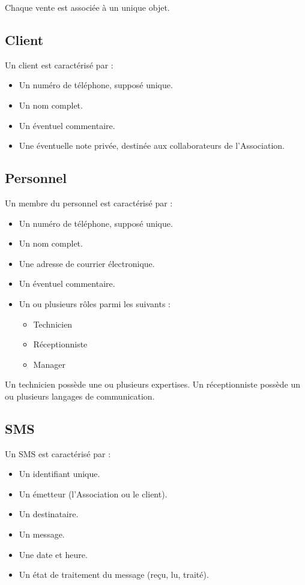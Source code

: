 \documentclass{article}
\begin{document}
Chaque vente est associée à un unique objet.

\subsection*{Client}
Un client est caractérisé par :
\begin{itemize}
    \item Un numéro de téléphone, supposé unique.
    \item Un nom complet.
    \item Un éventuel commentaire.
    \item Une éventuelle note privée, destinée aux collaborateurs de l'Association.
\end{itemize}

\subsection*{Personnel}
Un membre du personnel est caractérisé par :
\begin{itemize}
    \item Un numéro de téléphone, supposé unique.
    \item Un nom complet.
    \item Une adresse de courrier électronique.
    \item Un éventuel commentaire.
    \item Un ou plusieurs rôles parmi les suivants :
    \begin{itemize}
        \item Technicien
        \item Réceptionniste
        \item Manager
    \end{itemize}
\end{itemize}

Un technicien possède une ou plusieurs expertises. Un réceptionniste possède un ou plusieurs langages de communication.

\subsection*{SMS}
Un SMS est caractérisé par :
\begin{itemize}
    \item Un identifiant unique.
    \item Un émetteur (l'Association ou le client).
    \item Un destinataire.
    \item Un message.
    \item Une date et heure.
    \item Un état de traitement du message (reçu, lu, traité).
\end{itemize}
\end{document}
